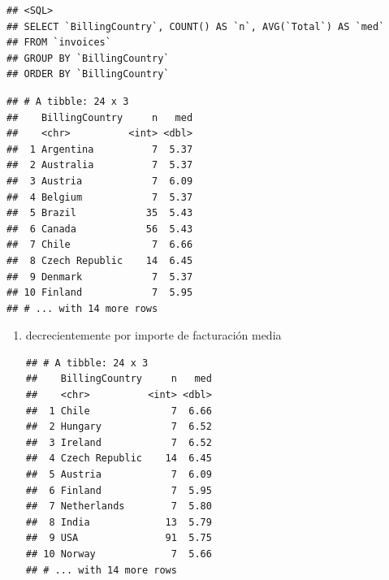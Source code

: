 \documentclass[]{book}
\newenvironment{Shaded}{\begin{snugshade}}{\end{snugshade}}
\newcommand{\KeywordTok}[1]{\textcolor[rgb]{0.13,0.29,0.53}{\textbf{#1}}}
\newcommand{\DataTypeTok}[1]{\textcolor[rgb]{0.13,0.29,0.53}{#1}}
\newcommand{\StringTok}[1]{\textcolor[rgb]{0.31,0.60,0.02}{#1}}
\newcommand{\OtherTok}[1]{\textcolor[rgb]{0.56,0.35,0.01}{#1}}
\newcommand{\OperatorTok}[1]{\textcolor[rgb]{0.81,0.36,0.00}{\textbf{#1}}}
\newcommand{\NormalTok}[1]{#1}
\begin{document}
\begin{enumerate}
\begin{verbatim}
## <SQL>
## SELECT `BillingCountry`, COUNT() AS `n`, AVG(`Total`) AS `med`
## FROM `invoices`
## GROUP BY `BillingCountry`
## ORDER BY `BillingCountry`
\end{verbatim}

\begin{Shaded}
\end{Shaded}

\begin{verbatim}
## # A tibble: 24 x 3
##    BillingCountry     n   med
##    <chr>          <int> <dbl>
##  1 Argentina          7  5.37
##  2 Australia          7  5.37
##  3 Austria            7  6.09
##  4 Belgium            7  5.37
##  5 Brazil            35  5.43
##  6 Canada            56  5.43
##  7 Chile              7  6.66
##  8 Czech Republic    14  6.45
##  9 Denmark            7  5.37
## 10 Finland            7  5.95
## # ... with 14 more rows
\end{verbatim}
\end{enumerate}

\begin{enumerate}
\def\labelenumi{(\alph{enumi})}
\setcounter{enumi}{1}
\item
  decrecientemente por importe de facturación media

\begin{Shaded}
\end{Shaded}

\begin{verbatim}
## # A tibble: 24 x 3
##    BillingCountry     n   med
##    <chr>          <int> <dbl>
##  1 Chile              7  6.66
##  2 Hungary            7  6.52
##  3 Ireland            7  6.52
##  4 Czech Republic    14  6.45
##  5 Austria            7  6.09
##  6 Finland            7  5.95
##  7 Netherlands        7  5.80
##  8 India             13  5.79
##  9 USA               91  5.75
## 10 Norway             7  5.66
## # ... with 14 more rows
\end{verbatim}
\end{enumerate}
\end{document}
